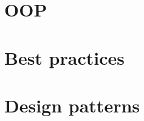 \documentclass[a4paper]{article}
\title{}
\date{}
\begin{document}
    \maketitle
    \section{OOP}
    \section{Best practices}
    \section{Design patterns}
\end{document}
